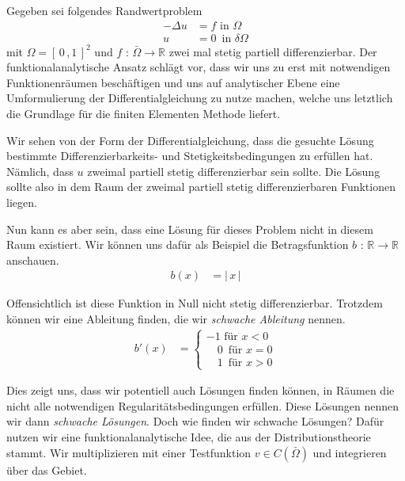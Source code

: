 Gegeben sei folgendes Randwertproblem
\begin{equation} \label{eq:dg}
\begin{aligned}
	- \Delta u &= f \text{ in } \Omega \\
	u &= 0 \, \text{ in } \delta \Omega	
\end{aligned}
\end{equation}
mit $\Omega = [ \, 0 \, ,1 \, ]^{2}$ und $f$ : $\bar{\Omega} \rightarrow \mathbb{R}$ zwei mal stetig partiell differenzierbar.
Der funktionalanalytische Ansatz schlägt vor, dass wir uns zu erst mit notwendigen Funktionenräumen beschäftigen und uns auf analytischer Ebene eine Umformulierung der Differentialgleichung zu nutze machen, welche uns letztlich die Grundlage für die finiten Elementen Methode liefert.

Wir sehen von der Form der Differentialgleichung, dass die gesuchte Lösung bestimmte Differenzierbarkeits- und Stetigkeitsbedingungen zu erfüllen hat. Nämlich, dass $u$ zweimal partiell stetig differenzierbar sein sollte. Die Lösung sollte also in dem Raum der zweimal partiell stetig differenzierbaren Funktionen liegen.

Nun kann es aber sein, dass eine Lösung für dieses Problem nicht in diesem Raum existiert. Wir können uns dafür als Beispiel die Betragsfunktion $b$ : $\mathbb{R} \rightarrow \mathbb{R}$ anschauen.
\begin{equation}
\begin{aligned}
b(x) &= | \, x \, |
\end{aligned}
\end{equation}

Offensichtlich ist diese Funktion in Null nicht stetig differenzierbar. Trotzdem können wir eine Ableitung finden, die wir \textit{schwache Ableitung} nennen. 
\begin{equation}
\begin{aligned}
b'(x) &= 
\begin{cases}
-1 \text{ für } x < 0 \\
\, \, \text{  }0 \, \text{ für } x = 0  \\
\, \, \text{  }1 \, \text{ für } x > 0 
\end{cases}
\end{aligned}
\end{equation}

Dies zeigt uns, dass wir potentiell auch Lösungen finden können, in Räumen die nicht alle notwendigen Regularitätsbedingungen erfüllen. Diese Lösungen nennen wir dann \textit{schwache Lösungen}. Doch wie finden wir schwache Lösungen?
Dafür nutzen wir eine funktionalanalytische Idee, die aus der Distributionstheorie stammt.
Wir multiplizieren mit einer Testfunktion $v \in C(\bar{\Omega})$  und integrieren über das Gebiet.

